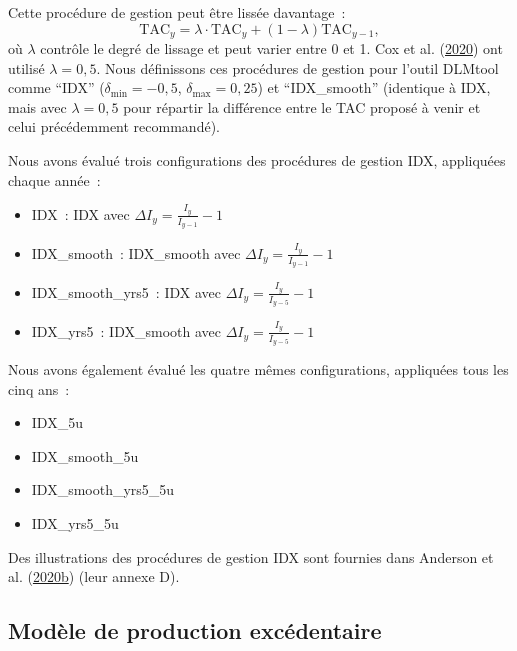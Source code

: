 \documentclass[french,11pt]{book}
\begin{document}
Cette procédure de gestion peut être lissée davantage~:
\begin{equation}
\textrm{TAC}_y = \lambda \cdot \textrm{TAC}_y + (1-\lambda) \textrm{TAC}_{y-1},
\end{equation}
où \(\lambda\) contrôle le degré de lissage et peut varier entre 0 et 1. Cox et al. (\protect\hyperlink{ref-cox2020}{2020}) ont utilisé \(\lambda=0,5\). Nous définissons ces procédures de gestion pour l'outil DLMtool comme ``IDX'' (\(\delta_{\textrm{min}} = -0,5\), \(\delta_{\textrm{max}} = 0,25\)) et ``IDX\_smooth'' (identique à IDX, mais avec \(\lambda = 0,5\) pour répartir la différence entre le TAC proposé à venir et celui précédemment recommandé).

Nous avons évalué trois configurations des procédures de gestion IDX, appliquées chaque année~:
\begin{itemize}
\item
  IDX~: IDX avec \(\Delta I_y = \frac{I_y}{I_{y-1}} -1\)
\item
  IDX\_smooth~: IDX\_smooth avec \(\Delta I_y = \frac{I_y}{I_{y-1}} -1\)
\item
  IDX\_smooth\_yrs5~: IDX avec \(\Delta I_y = \frac{I_y}{I_{y-5}} -1\)
\item
  IDX\_yrs5~: IDX\_smooth avec \(\Delta I_y = \frac{I_y}{I_{y-5}} -1\)
\end{itemize}
Nous avons également évalué les quatre mêmes configurations, appliquées tous les cinq ans~:
\begin{itemize}
\item
  IDX\_5u
\item
  IDX\_smooth\_5u
\item
  IDX\_smooth\_yrs5\_5u
\item
  IDX\_yrs5\_5u
\end{itemize}
Des illustrations des procédures de gestion IDX sont fournies dans Anderson et al. (\protect\hyperlink{ref-anderson2020gfmp}{2020b}) (leur annexe D).

\hypertarget{sec:mp-model-based}{%
\label{sec:mp-model-based}}

\hypertarget{sec:mp-sp}{%
\subsection{Modèle de production excédentaire}\label{sec:mp-sp}}
\end{document}
